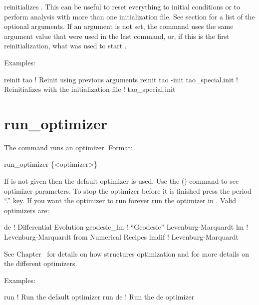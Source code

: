 reinitializes \tao. This can be useful to reset everything to
initial conditions or to perform analysis with more than one initialization file. See
section  for a list of the optional arguments.  If an argument is not
set, the  command uses the same argument value that were used in the last
 command, or, if this is the first reinitialization, what was used to
start \tao.

Examples:
\begin{example}
  reinit tao                         ! Reinit using previous arguments
  reinit tao -init tao_special.init  ! Reinitializes \tao with the initialization file 
                                     !   tao_special.init
\end{example}


\section{run_optimizer}
\label{s:run}

The  command runs an optimizer. Format:
\begin{example}
  run_optimizer \{<optimizer>\}
\end{example}

\vskip 10pt 

If  is not given then the default optimizer is used. 
Use the  () command to see optimizer parameters.
To stop the optimizer
before it is finished press the period ``.''  key. If you want the optimizer to run
forever run the optimizer in . Valid optimizers are:
\begin{example}
  de            ! Differential Evolution
  geodesic_lm   ! ``Geodesic'' Levenburg-Marquardt 
  lm            ! Levenburg-Marquardt from Numerical Recipes 
  lmdif         ! Levenburg-Marquardt 
\end{example}

See Chapter~ for details on how \tao structures optimization and 
for more details on the different optimizers.

Examples:
\begin{example}
  run         ! Run the default optimizer
  run de      ! Run the de optimizer
\end{example}

